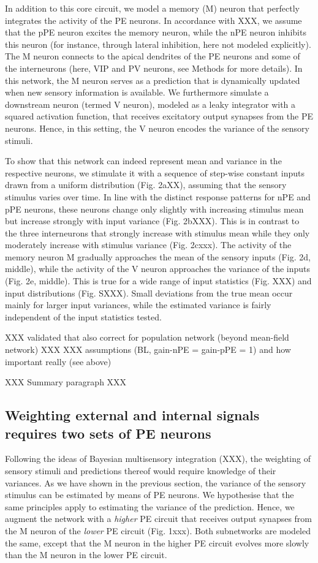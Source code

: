 \documentclass[10pt,a4paper,draft]{article}
\begin{document}
In addition to this core circuit, we model a memory (M) neuron that perfectly integrates the activity of the PE neurons. In accordance with XXX, we assume that the pPE neuron excites the memory neuron, while the nPE neuron inhibits this neuron (for instance, through lateral inhibition, here not modeled explicitly). The M neuron connects to the apical dendrites of the PE neurons and some of the interneurons (here, VIP and PV neurons, see Methods for more details). In this network, the M neuron serves as a prediction that is dynamically updated when new sensory information is available. We furthermore simulate a downstream neuron (termed V neuron), modeled as a leaky integrator with a squared activation function, that receives excitatory output synapses from the PE neurons. Hence, in this setting, the V neuron encodes the variance of the sensory stimuli. 

To show that this network can indeed represent mean and variance in the respective neurons, we stimulate it with a sequence of step-wise constant inputs drawn from a uniform distribution (Fig. 2aXX), assuming that the sensory stimulus varies over time. In line with the distinct response patterns for nPE and pPE neurons, these neurons change only slightly with increasing stimulus mean but increase strongly with input variance (Fig. 2bXXX). This is in contrast to the three interneurons that strongly increase with stimulus mean while they only moderately increase with stimulus variance (Fig. 2cxxx). The activity of the memory neuron M gradually approaches the mean of the sensory inputs (Fig. 2d, middle), while the activity of the V neuron approaches the variance of the inputs (Fig. 2e, middle). This is true for a wide range of input statistics (Fig. XXX) and input distributions (Fig. SXXX). Small deviations from the true mean occur mainly for larger input variances, while the estimated variance is fairly independent of the input statistics tested. 

XXX validated that also correct for population network (beyond mean-field network) XXX
XXX assumptions (BL, gain-nPE = gain-pPE = 1) and how important really (see above)

XXX Summary paragraph XXX


\subsection*{Weighting external and internal signals requires two sets of PE neurons}
%
Following the ideas of Bayesian multisensory integration (XXX), the weighting of sensory stimuli and predictions thereof would require knowledge of their variances. As we have shown in the previous section, the variance of the sensory stimulus can be estimated by means of PE neurons. We hypothesise that the same principles apply to estimating the variance of the prediction. Hence, we augment the network with a \textit{higher} PE circuit that receives output synapses from the M neuron of the \textit{lower} PE circuit (Fig. 1xxx). Both subnetworks are modeled the same, except that the M neuron in the higher PE circuit evolves more slowly than the M neuron in the lower PE circuit. 
\end{document}
